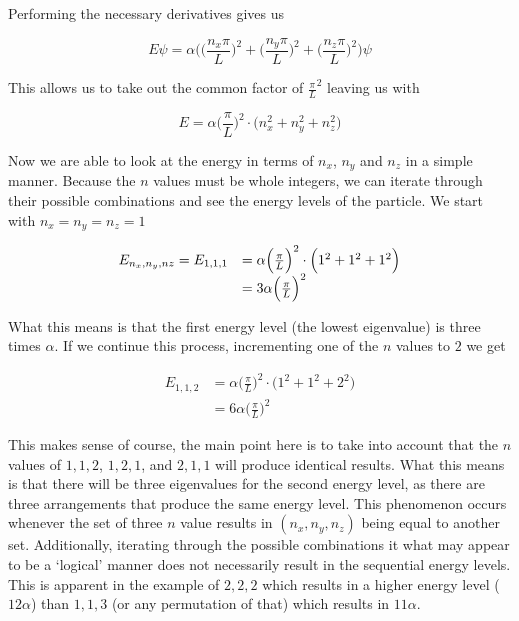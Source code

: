 \documentclass[authoryearcitations]{UoYCSproject}
\begin{document}
Performing the necessary derivatives gives us

\begin{equation}
E\psi =\alpha \bigg(\Big(\frac{n_x \pi}{L}\Big)^2 + \Big(\frac{n_y \pi}{L}\Big)^2 + \Big(\frac{n_z \pi}{L}\Big)^2\bigg) \psi 
\label{eq:timeIndependent4}
\end{equation}

This allows us to take out the common factor of $\frac{\pi}{L}^2$ leaving us with

\begin{equation}
E = \alpha \Big(\frac{\pi}{L}\Big)^2 \cdot \Big(n_{x}^2 + n_{y}^2 + n_{z}^2\Big)
\label{SchrodingerLast}
\end{equation}

Now we are able to look at the energy in terms of $n_x$, $n_y$ and $n_z$ in a simple manner. Because the $n$ values
must be whole integers, we can iterate through their possible combinations and see the energy levels of the particle. 
We start with $n_x = n_y = n_z = 1$

\begin{equation}
\begin{array}{r l}
E_{n_{x},n_{y},n{z}} = E_{1,1,1} &= \alpha\Big(\frac{\pi}{L}\Big)^2 \cdot \Big(1^2 + 1^2 + 1^2\Big) \nonumber \\
                                 &= 3\alpha\Big(\frac{\pi}{L}\Big)^2  
\label{Esubn}
\end{array}
\end{equation}

What this means is that the first energy level (the lowest eigenvalue) is three times $\alpha$. If we continue this process,
incrementing one of the $n$ values to $2$ we get

\begin{align}
E_{1,1,2} &= \alpha\Big(\frac{\pi}{L}\Big)^2 \cdot \Big(1^2 + 1^2 + 2^2\Big) \nonumber \\
                                 &= 6\alpha\Big(\frac{\pi}{L}\Big)^2  
\label{Esubn2}
\end{align}

This makes sense of course, the main point here is to take into account that the $n$ values of $1,1,2$, $1,2,1$, and
$2,1,1$ will produce identical results. What this means is that there will be three eigenvalues for the second energy level, as
there are three arrangements that produce the same energy level. This phenomenon
occurs whenever the set of three $n$ value results in $(n_x, n_y, n_z)$ being equal to another set. 
Additionally, iterating through the possible combinations it what may appear to be a `logical' manner does not necessarily result
in the sequential energy levels. This is apparent in the example of $2,2,2$  which results in a
higher energy level ($12\alpha$) than $1,1,3$ (or any permutation of that) which results in $11\alpha$.
\end{document}
